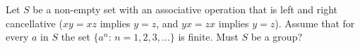 Let $S$ be a non-empty set with an associative operation that is left and
right cancellative ($xy=xz$ implies $y=z$, and $yx=zx$ implies $y=z$).
Assume that for every $a$ in $S$ the set $\{a^n:\,n=1, 2, 3, \ldots\}$ is
finite. Must $S$ be a group?
